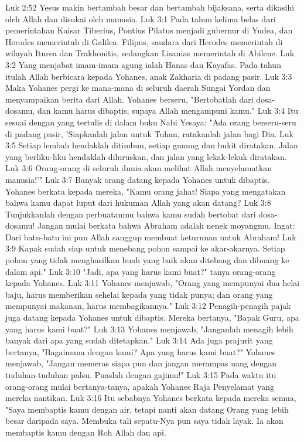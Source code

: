 Luk 2:52  Yesus makin bertambah besar dan bertambah bijaksana, serta dikasihi oleh Allah dan disukai oleh manusia.
Luk 3:1  Pada tahun kelima belas dari pemerintahan Kaisar Tiberius, Pontius Pilatus menjadi gubernur di Yudea, dan Herodes memerintah di Galilea. Filipus, saudara dari Herodes memerintah di wilayah Iturea dan Trakhonitis, sedangkan Lisanias memerintah di Abilene.
Luk 3:2  Yang menjabat imam-imam agung ialah Hanas dan Kayafas. Pada tahun itulah Allah berbicara kepada Yohanes, anak Zakharia di padang pasir.
Luk 3:3  Maka Yohanes pergi ke mana-mana di seluruh daerah Sungai Yordan dan menyampaikan berita dari Allah. Yohanes berseru, "Bertobatlah dari dosa-dosamu, dan kamu harus dibaptis, supaya Allah mengampuni kamu."
Luk 3:4  Itu sesuai dengan yang tertulis di dalam buku Nabi Yesaya: "Ada orang berseru-seru di padang pasir, 'Siapkanlah jalan untuk Tuhan, ratakanlah jalan bagi Dia.
Luk 3:5  Setiap lembah hendaklah ditimbun, setiap gunung dan bukit diratakan. Jalan yang berliku-liku hendaklah diluruskan, dan jalan yang lekak-lekuk diratakan.
Luk 3:6  Orang-orang di seluruh dunia akan melihat Allah menyelamatkan manusia!'"
Luk 3:7  Banyak orang datang kepada Yohanes untuk dibaptis. Yohanes berkata kepada mereka, "Kamu orang jahat! Siapa yang mengatakan bahwa kamu dapat luput dari hukuman Allah yang akan datang?
Luk 3:8  Tunjukkanlah dengan perbuatanmu bahwa kamu sudah bertobat dari dosa-dosamu! Jangan mulai berkata bahwa Abraham adalah nenek moyangmu. Ingat: Dari batu-batu ini pun Allah sanggup membuat keturunan untuk Abraham!
Luk 3:9  Kapak sudah siap untuk menebang pohon sampai ke akar-akarnya. Setiap pohon yang tidak menghasilkan buah yang baik akan ditebang dan dibuang ke dalam api."
Luk 3:10  "Jadi, apa yang harus kami buat?" tanya orang-orang kepada Yohanes.
Luk 3:11  Yohanes menjawab, "Orang yang mempunyai dua helai baju, harus memberikan sehelai kepada yang tidak punya; dan orang yang mempunyai makanan, harus membagikannya."
Luk 3:12  Penagih-penagih pajak juga datang kepada Yohanes untuk dibaptis. Mereka bertanya, "Bapak Guru, apa yang harus kami buat?"
Luk 3:13  Yohanes menjawab, "Janganlah menagih lebih banyak dari apa yang sudah ditetapkan."
Luk 3:14  Ada juga prajurit yang bertanya, "Bagaimana dengan kami? Apa yang harus kami buat?" Yohanes menjawab, "Jangan memeras siapa pun dan jangan merampas uang dengan tuduhan-tuduhan palsu. Puaslah dengan gajimu!"
Luk 3:15  Pada waktu itu orang-orang mulai bertanya-tanya, apakah Yohanes Raja Penyelamat yang mereka nantikan.
Luk 3:16  Itu sebabnya Yohanes berkata kepada mereka semua, "Saya membaptis kamu dengan air, tetapi nanti akan datang Orang yang lebih besar daripada saya. Membuka tali sepatu-Nya pun saya tidak layak. Ia akan membaptis kamu dengan Roh Allah dan api.
